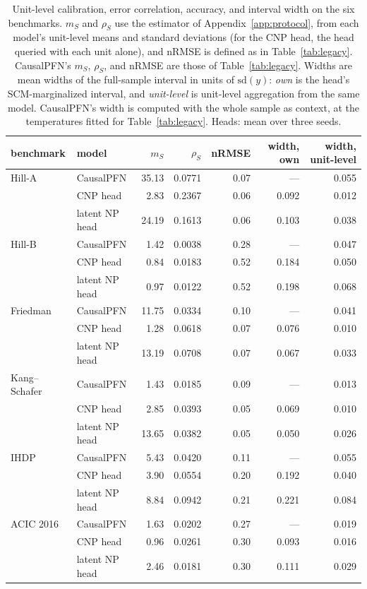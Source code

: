 \begin{table}[tp]
\centering
\footnotesize
\setlength{\tabcolsep}{4pt}
\begin{tabular}{llrrrrr}
\toprule
\textbf{benchmark} & \textbf{model} & \textbf{$m_S$} & \textbf{$\rho_S$} & \textbf{nRMSE} & \textbf{width, own} & \textbf{width, unit-level} \\
\midrule
Hill-A & CausalPFN & 35.13 & 0.0771 & 0.07 & --- & 0.055 \\
 & CNP head & 2.83 & 0.2367 & 0.06 & 0.092 & 0.012 \\
 & latent NP head & 24.19 & 0.1613 & 0.06 & 0.103 & 0.038 \\
\addlinespace[2pt]
Hill-B & CausalPFN & 1.42 & 0.0038 & 0.28 & --- & 0.047 \\
 & CNP head & 0.84 & 0.0183 & 0.52 & 0.184 & 0.050 \\
 & latent NP head & 0.97 & 0.0122 & 0.52 & 0.198 & 0.068 \\
\addlinespace[2pt]
Friedman & CausalPFN & 11.75 & 0.0334 & 0.10 & --- & 0.041 \\
 & CNP head & 1.28 & 0.0618 & 0.07 & 0.076 & 0.010 \\
 & latent NP head & 13.19 & 0.0708 & 0.07 & 0.067 & 0.033 \\
\addlinespace[2pt]
Kang--Schafer & CausalPFN & 1.43 & 0.0185 & 0.09 & --- & 0.013 \\
 & CNP head & 2.85 & 0.0393 & 0.05 & 0.069 & 0.010 \\
 & latent NP head & 13.65 & 0.0382 & 0.05 & 0.050 & 0.026 \\
\addlinespace[2pt]
IHDP & CausalPFN & 5.43 & 0.0420 & 0.11 & --- & 0.055 \\
 & CNP head & 3.90 & 0.0554 & 0.20 & 0.192 & 0.040 \\
 & latent NP head & 8.84 & 0.0942 & 0.21 & 0.221 & 0.084 \\
\addlinespace[2pt]
ACIC 2016 & CausalPFN & 1.63 & 0.0202 & 0.27 & --- & 0.019 \\
 & CNP head & 0.96 & 0.0261 & 0.30 & 0.093 & 0.016 \\
 & latent NP head & 2.46 & 0.0181 & 0.30 & 0.111 & 0.029 \\
\bottomrule
\end{tabular}
\caption{Unit-level calibration, error correlation, accuracy, and interval width on the six benchmarks. $m_S$ and $\rho_S$ use the estimator of Appendix~\ref{app:protocol}, from each model's unit-level means and standard deviations (for the CNP head, the head queried with each unit alone), and nRMSE is defined as in Table~\ref{tab:legacy}. CausalPFN's $m_S$, $\rho_S$, and nRMSE are those of Table~\ref{tab:legacy}. Widths are mean widths of the full-sample interval in units of $\mathrm{sd}(y)$: \emph{own} is the head's SCM-marginalized interval, and \emph{unit-level} is unit-level aggregation from the same model. CausalPFN's width is computed with the whole sample as context, at the temperatures fitted for Table~\ref{tab:legacy}. Heads: mean over three seeds.}
\label{tab:heads-moments}
\end{table}
